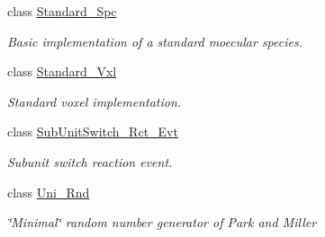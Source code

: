 \begin{DoxyCompactItemize}
class \hyperlink{classnw_1_1_standard___spc}{Standard\+\_\+\+Spc}
\begin{DoxyCompactList}\small\item\em Basic implementation of a standard moecular species. \end{DoxyCompactList}\item 
class \hyperlink{classnw_1_1_standard___vxl}{Standard\+\_\+\+Vxl}
\begin{DoxyCompactList}\small\item\em Standard voxel implementation. \end{DoxyCompactList}\item 
class \hyperlink{classnw_1_1_sub_unit_switch___rct___evt}{Sub\+Unit\+Switch\+\_\+\+Rct\+\_\+\+Evt}
\begin{DoxyCompactList}\small\item\em Subunit switch reaction event. \end{DoxyCompactList}\item 
class \hyperlink{classnw_1_1_uni___rnd}{Uni\+\_\+\+Rnd}
\begin{DoxyCompactList}\small\item\em \char`\"{}\+Minimal\char`\"{} random number generator of Park and Miller \end{DoxyCompactList}\end{DoxyCompactItemize}
